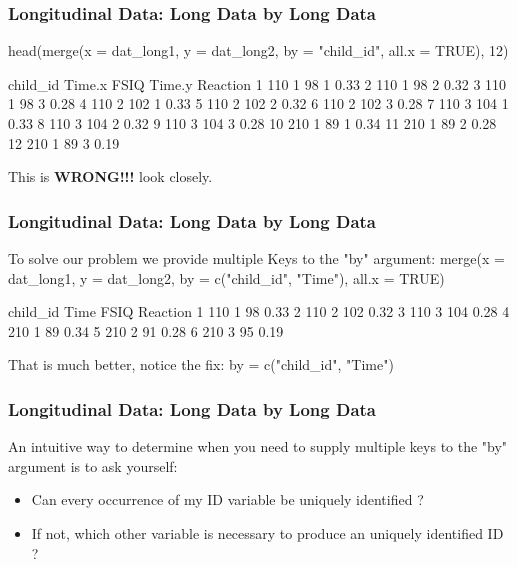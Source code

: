 \documentclass[10pt,american]{beamer}
\renewenvironment{Schunk}{}{}
\renewenvironment{Sinput}{}{}
\begin{document}
\begin{frame}[containsverbatim]
\frametitle{Longitudinal Data: Long Data by Long Data}
\begin{Schunk}
\begin{Sinput}
 head(merge(x = dat_long1, y = dat_long2, by = "child_id", all.x = TRUE), 12)
\end{Sinput}
\begin{Soutput}
   child_id Time.x FSIQ Time.y Reaction
1       110      1   98      1     0.33
2       110      1   98      2     0.32
3       110      1   98      3     0.28
4       110      2  102      1     0.33
5       110      2  102      2     0.32
6       110      2  102      3     0.28
7       110      3  104      1     0.33
8       110      3  104      2     0.32
9       110      3  104      3     0.28
10      210      1   89      1     0.34
11      210      1   89      2     0.28
12      210      1   89      3     0.19
\end{Soutput}
\end{Schunk}
This is \textbf{WRONG!!!} look closely.
\end{frame}


\begin{frame}[containsverbatim]
\frametitle{Longitudinal Data: Long Data by Long Data}
To solve our problem we provide multiple Keys to the "by" argument:
\begin{Schunk}
\begin{Sinput}
 merge(x = dat_long1, y = dat_long2, by = c("child_id", "Time"), all.x = TRUE)
\end{Sinput}
\begin{Soutput}
  child_id Time FSIQ Reaction
1      110    1   98     0.33
2      110    2  102     0.32
3      110    3  104     0.28
4      210    1   89     0.34
5      210    2   91     0.28
6      210    3   95     0.19
\end{Soutput}
\end{Schunk}
That is much better, notice the fix:
\begin{Schunk}
\begin{Sinput}
 by = c("child_id", "Time")
\end{Sinput}
\end{Schunk}
\end{frame}


\begin{frame}
\frametitle{Longitudinal Data: Long Data by Long Data}
An intuitive way to determine when you need to supply multiple keys to the "by" argument is to ask yourself:
\begin{itemize}
\item Can every occurrence of my ID variable be uniquely identified ?
\item If not, which other variable is necessary to produce an uniquely identified ID ?
\end{itemize}
\end{frame}
\end{document}
